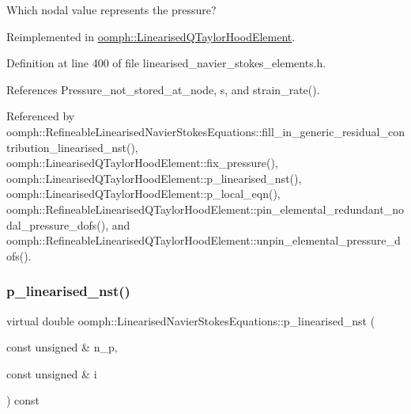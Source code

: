 Which nodal value represents the pressure? 



Reimplemented in \hyperlink{classoomph_1_1LinearisedQTaylorHoodElement_a9b411b9d761bbefa1ff7133fd053433f}{oomph\+::\+Linearised\+Q\+Taylor\+Hood\+Element}.



Definition at line 400 of file linearised\+\_\+navier\+\_\+stokes\+\_\+elements.\+h.



References Pressure\+\_\+not\+\_\+stored\+\_\+at\+\_\+node, s, and strain\+\_\+rate().



Referenced by oomph\+::\+Refineable\+Linearised\+Navier\+Stokes\+Equations\+::fill\+\_\+in\+\_\+generic\+\_\+residual\+\_\+contribution\+\_\+linearised\+\_\+nst(), oomph\+::\+Linearised\+Q\+Taylor\+Hood\+Element\+::fix\+\_\+pressure(), oomph\+::\+Linearised\+Q\+Taylor\+Hood\+Element\+::p\+\_\+linearised\+\_\+nst(), oomph\+::\+Linearised\+Q\+Taylor\+Hood\+Element\+::p\+\_\+local\+\_\+eqn(), oomph\+::\+Refineable\+Linearised\+Q\+Taylor\+Hood\+Element\+::pin\+\_\+elemental\+\_\+redundant\+\_\+nodal\+\_\+pressure\+\_\+dofs(), and oomph\+::\+Refineable\+Linearised\+Q\+Taylor\+Hood\+Element\+::unpin\+\_\+elemental\+\_\+pressure\+\_\+dofs().

\mbox{\label{classoomph_1_1LinearisedNavierStokesEquations_a7c3449ddb70e11667cb8926db5ce1174}} 
\subsubsection{\texorpdfstring{p\+\_\+linearised\+\_\+nst()}{p\_linearised\_nst()}}
{\footnotesize\ttfamily virtual double oomph\+::\+Linearised\+Navier\+Stokes\+Equations\+::p\+\_\+linearised\+\_\+nst (\begin{DoxyParamCaption}\item[{const unsigned \&}]{n\+\_\+p,  }\item[{const unsigned \&}]{i }\end{DoxyParamCaption}) const\hspace{0.3cm}{\ttfamily [pure virtual]}}



